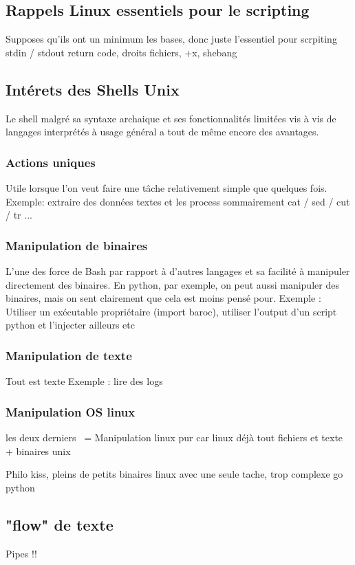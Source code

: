 \documentclass[11pt,a4paper]{article}
\begin{document}
\subsection{Rappels Linux essentiels pour le scripting}
Supposes qu'ils ont un minimum les bases, donc juste l'essentiel pour scrpiting
stdin / stdout
return code, 
droits fichiers, +x, shebang

\subsection{Intérets des Shells Unix}
Le shell malgré sa syntaxe archaique et ses fonctionnalités limitées vis à vis de langages interprétés à usage général a tout de même encore des avantages.

\subsubsection{Actions uniques}
Utile lorsque l'on veut faire une tâche relativement simple que quelques fois. 
Exemple: extraire des données textes et les process sommairement
cat / sed / cut / tr ...

\subsubsection{Manipulation de binaires}
L'une des force de Bash par rapport à d'autres langages et sa facilité à manipuler directement des binaires. En python, par exemple, on peut aussi manipuler des binaires, mais on sent clairement que cela est moins pensé pour.
Exemple : Utiliser un exécutable propriétaire (import baroc), utiliser l'output d'un script python et l'injecter ailleurs etc


\subsubsection{Manipulation de texte}
Tout est texte
Exemple : lire des logs

\subsubsection{Manipulation OS linux}
les deux derniers ~= Manipulation linux pur car linux déjà tout fichiers et texte + binaires unix


Philo kiss, pleins de petits binaires linux avec une seule tache, trop complexe go python

\subsection{"flow" de texte}
Pipes !!
\end{document}
